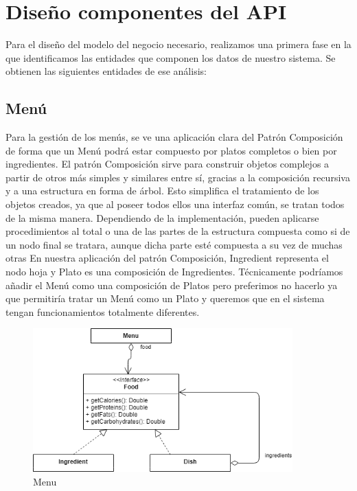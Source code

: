 \documentclass[12pt, a4paper, twoside]{book}
\begin{document}
	\section{Diseño componentes del API}
	
	Para el diseño del modelo del negocio necesario, realizamos una primera fase en la que identificamos las entidades que componen los datos de nuestro sistema. Se obtienen las siguientes entidades de ese análisis:
	
	\subsection{Menú}
	
	Para la gestión de los menús, se ve una aplicación clara del Patrón Composición de forma que un Menú podrá estar compuesto por platos completos o bien por ingredientes. 
	El patrón Composición sirve para construir objetos complejos a partir de otros más simples y similares entre sí, gracias a la composición recursiva y a una estructura en forma de árbol.
	Esto simplifica el tratamiento de los objetos creados, ya que al poseer todos ellos una interfaz común, se tratan todos de la misma manera. Dependiendo de la implementación, pueden aplicarse procedimientos al total o una de las partes de la estructura compuesta como si de un nodo final se tratara, aunque dicha parte esté compuesta a su vez de muchas otras \cite{Patrones}
	En nuestra aplicación del patrón Composición, Ingredient representa el nodo hoja y Plato es una composición de Ingredientes. Técnicamente podríamos añadir el Menú como una composición de Platos pero preferimos no hacerlo ya que permitiría tratar un Menú como un Plato y queremos que en el sistema tengan funcionamientos totalmente diferentes.
	
	\begin{figure}[H]
		\centering
		\includegraphics[width=10cm]{Imagenes/Menu.png}
		\caption{Menu}\label{Menu}
	\end{figure}
\end{document}

